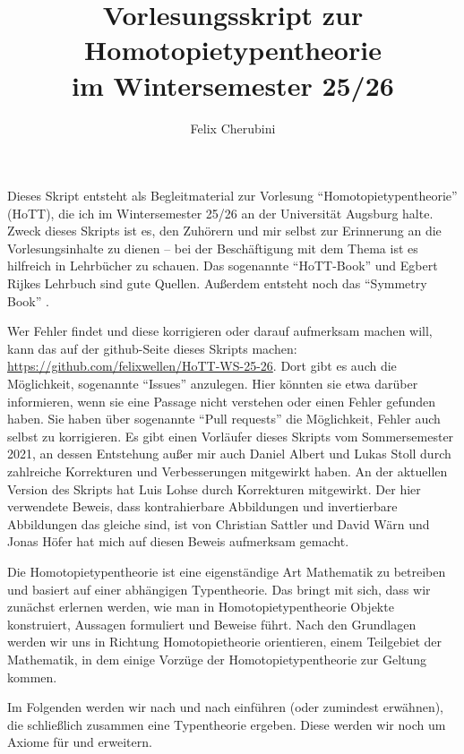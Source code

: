 \documentclass{../util/hott}
\title{Vorlesungsskript zur Homotopietypentheorie \\ im Wintersemester 25/26}
\author{Felix Cherubini}
\begin{document}
\maketitle

\tableofcontents
 \pagebreak
Dieses Skript entsteht als Begleitmaterial zur Vorlesung ``Homotopietypentheorie'' (HoTT), die ich im Wintersemester 25/26 an der Universität Augsburg halte.
Zweck dieses Skripts ist es, den Zuhörern und mir selbst zur Erinnerung an die Vorlesungsinhalte zu dienen --
bei der Beschäftigung mit dem Thema ist es hilfreich in Lehrbücher zu schauen.
Das sogenannte ``HoTT-Book''\cite{hott} und Egbert Rijkes Lehrbuch \cite{rijke} sind gute Quellen.
Außerdem entsteht noch das ``Symmetry Book'' \cite{Sym}.

Wer Fehler findet und diese korrigieren oder darauf aufmerksam machen will, kann das auf der github-Seite dieses Skripts machen:
\href{https://github.com/felixwellen/HoTT-WS-25-26}{https://github.com/felixwellen/HoTT-WS-25-26}.
Dort gibt es auch die Möglichkeit, sogenannte ``Issues'' anzulegen.
Hier könnten sie etwa darüber informieren, wenn sie eine Passage nicht verstehen oder einen Fehler gefunden haben.
Sie haben über sogenannte ``Pull requests'' die Möglichkeit, Fehler auch selbst zu korrigieren.
Es gibt einen Vorläufer dieses Skripts vom Sommersemester 2021, an dessen Entstehung außer mir auch Daniel Albert und Lukas Stoll durch zahlreiche Korrekturen und Verbesserungen mitgewirkt haben.
An der aktuellen Version des Skripts hat Luis Lohse durch Korrekturen mitgewirkt.
Der hier verwendete Beweis, dass kontrahierbare Abbildungen und invertierbare Abbildungen das gleiche sind, ist von Christian Sattler und David Wärn und Jonas Höfer hat mich auf diesen Beweis aufmerksam gemacht. 

Die Homotopietypentheorie ist eine eigenständige Art Mathematik zu betreiben und basiert auf einer abhängigen Typentheorie.
Das bringt mit sich, dass wir zunächst erlernen werden, wie man in Homotopietypentheorie Objekte konstruiert, Aussagen formuliert und Beweise führt.
Nach den Grundlagen werden wir uns in Richtung Homotopietheorie orientieren, einem Teilgebiet der Mathematik, in dem einige Vorzüge der Ho\-mo\-to\-pie\-ty\-pen\-theo\-rie zur Geltung kommen.

Im Folgenden werden wir nach und nach  einführen (oder zumindest erwähnen), die schließlich zusammen eine Typentheorie ergeben.
Diese werden wir noch um Axiome für  und  erweitern.
\end{document}
